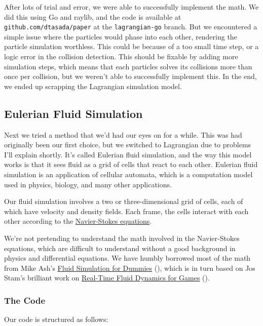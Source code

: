 \documentclass[a4paper,12pt]{article}
\begin{document}
After lots of trial and error, we were able to successfully implement the math.
We did this using Go and raylib, and the code is available at \verb|github.com/dtasada/paper| at the \verb|lagrangian-go| branch.
But we encountered a simple issue where the particles would phase into each other,
rendering the particle simulation worthless.
This could be because of a too small time step, or a logic error in the collision detection.
This should be fixable by adding more simulation steps, which means that each particles solves its collisions more than once per collision, but we weren't able to successfully implement this.
In the end, we ended up scrapping the Lagrangian simulation model.

\subsection{Eulerian Fluid Simulation}
Next we tried a method that we'd had our eyes on for a while. This was had
originally been our first choice, but we switched to Lagrangian due to problems I'll explain shortly.
It's called Eulerian fluid simulation, and the way this model works is that it
sees fluid as a grid of cells that react to each other.
Eulerian fluid simulation is an application of cellular automata,
which is a computation model used in physics, biology, and many other applications.

Our fluid simulation involves a two or three-dimensional grid of cells,
each of which have velocity and density fields.
Each frame, the cells interact with each other according to the
\hyperlink{https://en.wikipedia.org/wiki/Navier\%E2\%80\%93Stokes_equations}{Navier-Stokes equations}.

We're not pretending to understand the math involved in the Navier-Stokes equations,
which are difficult to understand without a good background in physics and differential equations.
We have humbly borrowed most of the math from Mike Ash's
\hyperlink{https://mikeash.com/pyblog/fluid-simulation-for-dummies.html}{Fluid Simulation for Dummies}
(\cite{mikeash}), which is in turn based on Jos Stam's brilliant work on
\hyperlink{http://graphics.cs.cmu.edu/nsp/course/15-464/Fall09/papers/StamFluidforGames.pdf}{Real-Time Fluid Dynamics for Games} (\cite{josstam}).

\subsubsection{The Code}
Our code is structured as follows:
\end{document}

